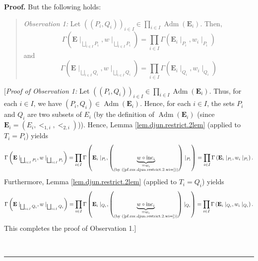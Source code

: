\documentclass[numbers=enddot,12pt,final,onecolumn,notitlepage,abstracton]{scrartcl}
\theoremstyle{definition}
\newenvironment{statement}{\begin{quote}}{\end{quote}}
\newenvironment{proof}[1][Proof]{\noindent\textbf{#1.} }{\ \rule{0.5em}{0.5em}}
\let\prodnonlimits\prod
\renewcommand{\prod}{\prodnonlimits\limits}
\newenvironment{verlong}{}{}
\begin{document}
\begin{verlong}
\begin{footnotesize}
\begin{proof}
But the following holds:

\begin{statement}
\textit{Observation 1:} Let $\left(  \left(  P_{i},Q_{i}\right)  \right)
_{i\in I}\in\prod_{i\in I}\operatorname*{Adm}\left(  \mathbf{E}_{i}\right)  $.
Then,%
\begin{equation}
\Gamma\left(  {\mathbf{E}}\mid_{\bigsqcup_{i\in I}P_{i}},w\mid_{\bigsqcup
_{i\in I}P_{i}}\right)  =\prod_{i\in I}\Gamma\left(  \mathbf{E}_{i}\mid
_{P_{i}},w_{i}\mid_{P_{i}}\right)  \label{pf.cor.djun.restrict.2.factor1}%
\end{equation}
and%
\begin{equation}
\Gamma\left(  {\mathbf{E}}\mid_{\bigsqcup_{i\in I}Q_{i}},w\mid_{\bigsqcup
_{i\in I}Q_{i}}\right)  =\prod_{i\in I}\Gamma\left(  \mathbf{E}_{i}\mid
_{Q_{i}},w_{i}\mid_{Q_{i}}\right)  \label{pf.cor.djun.restrict.2.factor2}%
\end{equation}

\end{statement}

[\textit{Proof of Observation 1:} Let $\left(  \left(  P_{i},Q_{i}\right)
\right)  _{i\in I}\in\prod_{i\in I}\operatorname*{Adm}\left(  \mathbf{E}%
_{i}\right)  $. Thus, for each $i\in I$, we have $\left(  P_{i},Q_{i}\right)
\in\operatorname*{Adm}\left(  \mathbf{E}_{i}\right)  $. Hence, for each $i\in
I$, the sets $P_{i}$ and $Q_{i}$ are two subsets of $E_{i}$ (by the definition
of $\operatorname*{Adm}\left(  \mathbf{E}_{i}\right)  $ (since $\mathbf{E}%
_{i}=\left(  E_{i},<_{1,i},<_{2,i}\right)  $)). Hence, Lemma
\ref{lem.djun.restrict.2lem} (applied to $T_{i}=P_{i}$) yields%
\[
\Gamma\left(  {\mathbf{E}}\mid_{\bigsqcup_{i\in I}P_{i}},w\mid_{\bigsqcup
_{i\in I}P_{i}}\right)
=\prod_{i\in I}\Gamma\left(  \mathbf{E}_{i}\mid
_{P_{i}},\left(\underbrace{w\circ\operatorname{inc}_{i}}_{\substack{
=w_i \\ \text{(by (\ref{pf.cor.djun.restrict.2.wi=}))}}}\right)\mid_{P_{i}}\right)
=\prod_{i\in I}\Gamma\left(  \mathbf{E}_{i}\mid
_{P_{i}},w_{i}\mid_{P_{i}}\right)  .
\]
Furthermore, Lemma \ref{lem.djun.restrict.2lem} (applied to $T_{i}=Q_{i}$)
yields%
\[
\Gamma\left(  {\mathbf{E}}\mid_{\bigsqcup_{i\in I}Q_{i}},w\mid_{\bigsqcup
_{i\in I}Q_{i}}\right)
=\prod_{i\in I}\Gamma\left(  \mathbf{E}_{i}\mid
_{Q_{i}},\left(\underbrace{w\circ\operatorname{inc}_{i}}_{\substack{
=w_i \\ \text{(by (\ref{pf.cor.djun.restrict.2.wi=}))}}}\right)\mid_{Q_{i}}\right)
=\prod_{i\in I}\Gamma\left(  \mathbf{E}_{i}\mid
_{Q_{i}},w_{i}\mid_{Q_{i}}\right)  .
\]
This completes the proof of Observation 1.]


\end{proof}
\end{footnotesize}
\end{verlong}
\end{document}
